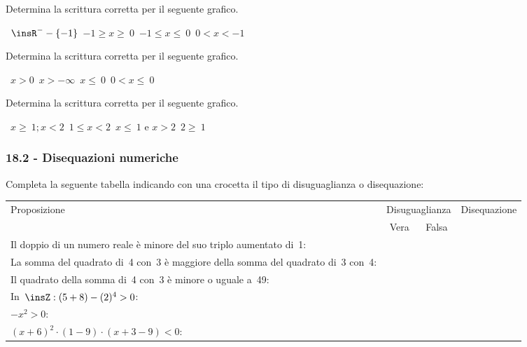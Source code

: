 \begin{esercizio}
 \label{ese:18.5}
Determina la scrittura corretta per il seguente grafico.
 \begin{center}
  

  \boxA\quad~$\insR^{-}-\{-1\}$\quad\boxB\quad~$-1\ge x\ge~0$\quad\boxC\quad~$-1\le x\le~0$\quad\boxD\quad~$0<x<-1$
 \end{center}
 \end{esercizio}

\begin{esercizio}
 \label{ese:18.6}
Determina la scrittura corretta per il seguente grafico.
 \begin{center}
  

  \boxA\quad~$x>0$\quad\boxB\quad~$x>-\infty $\quad\boxC\quad~$x\le~0$\quad\boxD\quad~$0<x\le~0$
 \end{center}
  \end{esercizio}

\begin{esercizio}
 \label{ese:18.7}
Determina la scrittura corretta per il seguente grafico.
 \begin{center}
  

  \boxA\quad~$x\ge~1;x<2$\quad\boxB\quad~$1\le x<2$\quad\boxC\quad~$x\le~1\text{ e }x>2$\quad\boxD\quad~$2\ge~1$
 \end{center}
  \end{esercizio}

\subsubsection*{18.2 - Disequazioni numeriche}
\begin{esercizio}
 \label{ese:18.8}
Completa la seguente tabella indicando con una crocetta il tipo di
disuguaglianza o disequazione:

 \begin{tabularx}{.9\textwidth}{Xccc}
 \toprule
 Proposizione&\multicolumn{2}{c}{Disuguaglianza}& Disequazione\\
  & Vera & Falsa & \\
 \midrule
 Il doppio di un numero reale è minore del suo triplo aumentato di~1: & & & \\
 La somma del quadrato di~4 con~3 è maggiore della somma del quadrato di~3 con~4: & & &\\
 Il quadrato della somma di~4 con~3 è minore o uguale a~49: & & & \\
 In~$\insZ:(5+8)-(2)^{4}>0$: & & & \\
 $-x^{2}>0$: & & & \\
 $(x+6)^{2}\cdot (1-9)\cdot (x+3-9)<0$: & & & \\
 \bottomrule
 \end{tabularx}
\end{esercizio}

